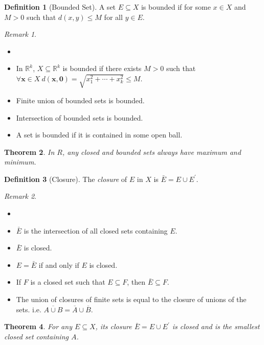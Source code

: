 \documentclass[12pt, lettersize]{book}
\theoremstyle{plain}
\newtheorem{thm}{Theorem}[section]
\theoremstyle{definition}
\newtheorem{dfn}[thm]{Definition}
\theoremstyle{remark}
\newtheorem*{rem}{Remark}
\newcommand{\R}{\mathbb{R}}
\begin{document}
		\begin{dfn}[Bounded Set]
			A set $E\subseteq X$ is bounded if for some $x\in X$ and $M>0$ such that $d(x,y)\leq M$ for all $y\in E$.
		\end{dfn}
		\begin{rem}
			\begin{itemize}
				\item[]
				\item In $\R^k$, $X\subseteq\R^k$ is bounded if there exists $M>0$ such that $\forall\mathbf{x}\in X\ d(\mathbf{x},\mathbf{0})=\sqrt{x_1^2+\cdots+x_k^2}\leq M$.
				\item Finite union of bounded sets is bounded.
				\item Intersection of bounded sets is bounded.
				\item A set is bounded if it is contained in some open ball.
			\end{itemize}
		\end{rem}
		
		\begin{thm}
			In $R$, any closed and bounded sets always have maximum and minimum.
		\end{thm}
		
		\begin{dfn}[Closure]
			The \emph{closure} of $E$ in $X$ is $\bar{E}=E\cup E^\prime$.
		\end{dfn}
		\begin{rem}
			\begin{itemize}
				\item[]
				\item $\bar{E}$ is the intersection of all closed sets containing $E$.
				\item $\bar{E}$ is closed.
				\item $E=\bar{E}$ if and only if $E$ is closed.
				\item If $F$ is a closed set such that $E\subseteq F$, then $\bar{E}\subseteq F$.
				\item The union of closures of finite sets is equal to the closure of unions of the sets. i.e. $\overline{A\cup B}=\overline{A}\cup\overline{B}$.
			\end{itemize}
		\end{rem}
		
		\begin{thm}
			For any $E\subseteq X$, its closure $\bar{E}=E\cup E^\prime$ is closed and is the smallest closed set containing $A$.
		\end{thm}
		
\end{document}
